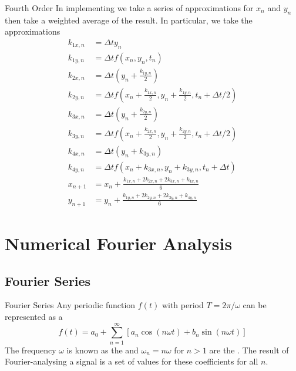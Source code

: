 \documentclass[12pt]{report}
\begin{document}
\begin{proc}{Fourth Order}{}
        In implementing we take a series of approximations for $x_n$ and $y_n$ then take a weighted average of the result. In particular, we take the approximations \begin{align}
                k_{1x,n} &= \Delta t y_n \\
                k_{1y,n} &= \Delta t f(x_n,y_n,t_n) \\
                k_{2x,n} &= \Delta t \left(y_n+ \frac{k_{1y,n}}{2}\right) \\
                k_{2y,n} &= \Delta tf\left(x_n + \frac{k_{1x,n}}{2}, y_n + \frac{k_{1y,n}}{2}, t_n + \Delta t/2\right) \\
                k_{3x,n} &= \Delta t\left(y_n+ \frac{k_{2y,n}}{2}\right) \\
                k_{3y,n} &= \Delta t f\left(x_n + \frac{k_{2x,n}}{2}, y_n + \frac{k_{2y,n}}{2}, t_n + \Delta t/2\right) \\
                k_{4x,n} &= \Delta t \left(y_n + k_{3y,n}\right)\\
                k_{4y,n} &= \Delta tf\left(x_n + k_{3x,n}, y_n + k_{3y,n}, t_n + \Delta t\right) \\
                x_{n+1} &= x_n + \frac{k_{1x,n} + 2k_{2x,n} + 2k_{3x,n} + k_{4x,n}}{6} \\
                y_{n+1} &= y_n + \frac{k_{1y,n} + 2k_{2y,n} + 2k_{3y,n} + k_{4y,n}}{6} 
        \end{align}
\end{proc}






\chapter{Numerical Fourier Analysis}


\section{Fourier Series}


\begin{defn}{Fourier Series}{}
        Any periodic function $f(t)$ with period $T = 2\pi/\omega$ can be represented as a \begin{equation}
                f(t) = a_0 + \sum_{n=1}^{\infty}\left[a_n\cos(n\omega t) + b_n\sin(n\omega t)\right]
        \end{equation}
        The frequency $\omega$ is known as the  and $\omega_n = n\omega$ for $n >1$ are the . The result of Fourier-analysing a signal is a set of values for these coefficients for all $n$.
\end{defn}
\end{document}
